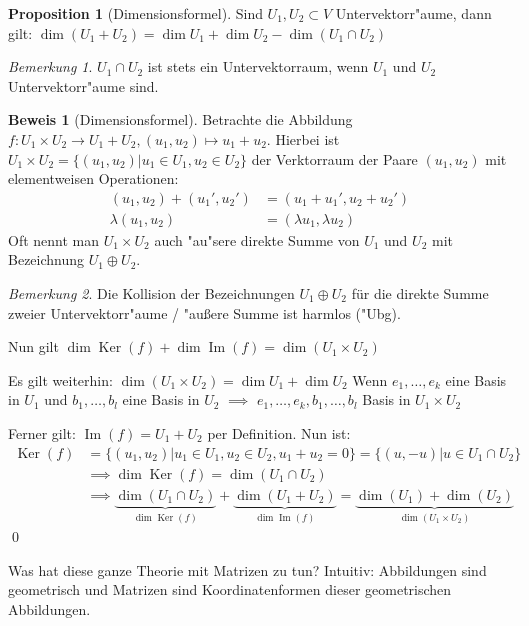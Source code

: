 \documentclass[11pt]{article}
\newcommand{\gq}[1]{\glqq{}#1\grqq{}} %
\DeclareMathOperator{\mKer}{Ker}
\DeclareMathOperator{\mIm}{Im}
\theoremstyle{remark}
\theoremstyle{definition}
\newtheorem{prof}{Beweis}
\newtheorem*{proposition}{Proposition}
\theoremstyle{remark}
\newtheorem*{bem}{Bemerkung}
\begin{document}
\begin{proposition}[Dimensionsformel]
Sind \(U_1, U_2 \subset V\) Untervektorr"aume, dann gilt: \(\dim(U_1 +U_2) =\dim U_1 + \dim U_2 - \dim (U_1\cap U_2)\)
\end{proposition}
\begin{bem}
\(U_1\cap U_2\) ist stets ein Untervektorraum, wenn \(U_1\) und \(U_2\) Untervektorr"aume sind.
\end{bem}
\begin{prof}[Dimensionsformel] 

Betrachte die Abbildung \(f: U_1 \times U_2 \to U_1 + U_2, (u_1, u_2) \mapsto u_1 + u_2 \). Hierbei ist \(U_1\times U_2 = \{(u_1, u_2) | u_1 \in U_1, u_2 \in U_2 \} \) der Verktorraum der Paare \((u_1, u_2)\) mit
elementweisen Operationen:
\begin{align*}
(u_1, u_2) + (u_1', u_2') &= (u_1 + u_1', u_2 + u_2') \\
\lambda (u_1, u_2) &= (\lambda u_1, \lambda u_2)
\end{align*}
Oft nennt man \(U_1 \times U_2\) auch \gq{"au"sere direkte Summe} von \(U_1\) und \(U_2\) mit Bezeichnung \(U_1 \oplus U_2\).
\begin{bem}Die Kollision der
Bezeichnungen \(U_1\oplus U_2\) für die direkte Summe zweier Untervektorr"aume / "außere Summe ist harmlos ("Ubg).
\end{bem}

Nun gilt \(\dim \mKer(f) + \dim\mIm(f) = \dim(U_1\times U_2) \)

Es gilt weiterhin: \(\dim(U_1 \times U_2) = \dim U_1 + \dim U_2 \) Wenn \(e_1, \dots, e_k \) eine Basis in \(U_1\) und \(b_1, \dots, b_l \) eine Basis in \(U_2\) \(\implies\) \(e_1, \dots, e_k, b_1, \dots, b_l\) Basis in \(U_1\times U_2\)

Ferner gilt: \(\mIm(f) = U_1 + U_2\) per Definition. Nun ist:
\begin{align*}
\mKer(f) &= \{(u_1, u_2) | u_1 \in U_1, u_2\in U_2, u_1 + u_2 = 0\} = \{(u, -u)| u \in U_1 \cap U_2 \}\\
&\implies \dim\mKer (f) = \dim(U_1 \cap U_2)\\
&\implies \underbrace{\dim(U_1 \cap U_2)}_{\dim\mKer(f)} + \underbrace{\dim(U_1 + U_2)}_{\dim\mIm(f)} = \underbrace{\dim(U_1) + \dim(U_2)}_{\dim (U_1\times U_2)}
\end{align*}\qed
\end{prof}

Was hat diese ganze Theorie mit Matrizen zu tun? Intuitiv: Abbildungen sind
\gq{geometrisch} und Matrizen sind Koordinatenformen dieser geometrischen
Abbildungen.
\end{document}
